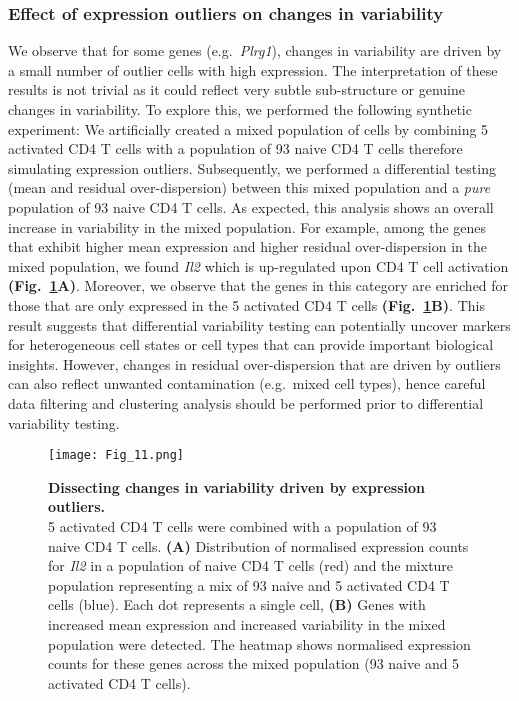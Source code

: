 \newpage

\subsubsection{Effect of expression outliers on changes in variability}

We observe that for some genes (e.g.~\textit{Plrg1}), changes in variability are driven by a small number of outlier cells with high expression. The interpretation of these results is not trivial as it could reflect very subtle sub-structure or genuine changes in variability. To explore this, we performed the following synthetic experiment: We artificially created a mixed population of cells by combining 5 activated CD4\plus{} T cells with a population of 93 naive CD4\plus{} T cells therefore simulating expression outliers. Subsequently, we performed a differential testing (mean and residual over-dispersion) between this mixed population and a \textit{pure} population of 93 naive CD4\plus{} T cells. As expected, this analysis shows an overall increase in variability in the mixed population. For example, among the genes that exhibit higher mean expression and higher residual over-dispersion in the mixed population, we found \textit{Il2} which is up-regulated upon CD4\plus{} T cell activation \textbf{(Fig.~\ref{fig2:mixture_population}A)}. Moreover, we observe that the genes in this category are enriched for those that are only expressed in the 5 activated CD4\plus{} T cells \textbf{(Fig.~\ref{fig2:mixture_population}B)}. This result suggests that differential variability testing can potentially uncover markers for heterogeneous cell states or cell types that can provide important biological insights. However, changes in residual over-dispersion that are driven by outliers can also reflect unwanted contamination (e.g.~mixed cell types), hence careful data filtering and clustering analysis should be performed prior to differential variability testing. 

\begin{figure}[!h]
\centering
\texttt{[image: Fig\_11.png]}
\caption[Dissecting changes in variability driven by expression outliers]{\textbf{Dissecting changes in variability driven by expression outliers.}\\
5 activated CD4\plus{} T cells were combined with a population of 93 naive CD4\plus{} T cells. \textbf{(A)} Distribution of normalised expression counts for \textit{Il2} in a population of naive CD4\plus{} T cells (red) and the mixture population representing a mix of 93 naive and 5 activated CD4\plus{} T cells (blue). Each dot represents a single cell, \textbf{(B)} Genes with increased mean expression and increased variability in the mixed population were detected. The heatmap shows normalised expression counts for these genes across the mixed population (93 naive and 5 activated CD4\plus{} T cells).}
\label{fig2:mixture_population}
\end{figure}

